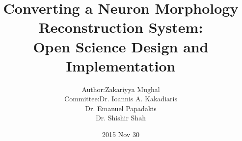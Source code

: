 \title[Converting a Neuron Morphology Reconstruction System: Open Science Design and Implementation]
{Converting a Neuron Morphology Reconstruction System:\\Open Science Design and Implementation}
\author[Zakariyya Mughal]{%
\begin{tabular}{r@{ }l}%
Author:    & Zakariyya Mughal \\[1ex]
Committee: & Dr. Ioannis A. Kakadiaris \\
           & Dr. Emanuel Papadakis \\
           & Dr. Shishir Shah
\end{tabular}%
}
\date{2015 Nov 30}

